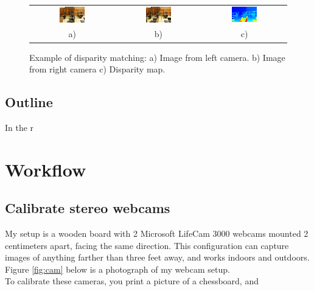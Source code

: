 \documentclass[11pt,fleqn]{article}
\begin{document}
\begin{figure}[!h]
\centering
\setlength{}
\begin{tabular}{ccc}
\includegraphics[width=0.32\textwidth]{images/im0-600.jpg} &
\includegraphics[width=0.32\textwidth]{images/im1-600.jpg} &
\includegraphics[width=0.32\textwidth]{images/disp-600.jpg} \\[2pt]
a) & b) & c) \\
\end{tabular}
\caption[Example of disparity matching]{Example of disparity matching: a) Image from left camera. b) Image from right camera c) Disparity map.}
\label{fig:example1}
\end{figure}

\subsection{Outline}

In the r

\section{Workflow}

\subsection{Calibrate stereo  webcams}

My setup is a wooden board with 2 Microsoft LifeCam 3000 webcams mounted 2 centimeters apart, facing the same direction. This configuration can capture images of anything farther than three feet away, and works indoors and outdoors. Figure \ref{fig:cam} below is a photograph of my webcam setup. \\[5pt]
%
To calibrate these cameras, you print a picture of a chessboard, and 
\end{document}
